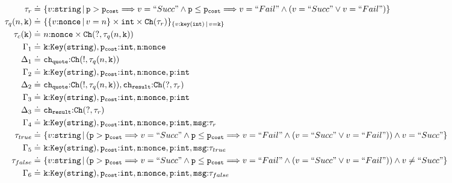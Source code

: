 \documentclass[master,english]{kuisthesis}
\theoremstyle{definition}
\begin{document}
{\small
\begin{align*}
    \tau_{r} \doteq&\ \nut{string}{
\price > \costprice {\implies}
 v = \success \land
\price \leq \costprice {\implies} 
v = \fail \land (v = \success \lor v = \fail)  }
    \\\tau_{q}(n,\Code{k}) \doteq&\ \{\nut{nonce}{v = n} \times \Code{int} \times \Ch(\tau_{r})\}_{\nut{key(int)}{v = \Code{k}}}
    \\\tau_{c}(\Code{k}) \doteq&\ n{:}\Code{nonce} \times \Ch(?,\tau_{q}(n, \Code{k}))
    \\\Gamma_1 \doteq&\  \Code{k}{:}\keyT{\Code{string}},\costprice{:}\Code{int},\Code{n}{:}\Code{nonce}
    \\\Delta_1 \doteq&\ \chq{:}\Ch(!,\tau_{q}(n, \Code{k}))
    \\\Gamma_2 \doteq&\  \Code{k}{:}\keyT{\Code{string}},\costprice{:}\Code{int},\Code{n}{:}\Code{nonce}, \price{:}\Code{int}
    \\\Delta_2 \doteq&\ \chq{:}\Ch(!,\tau_{q}(n, \Code{k})), \chr{:}\Ch(?,\tau_{r})
    \\\Gamma_3 \doteq&\ \Code{k}{:}\keyT{\Code{string}},\costprice{:}\Code{int},\Code{n}{:}\Code{nonce}, \price{:}\Code{int} 
    \\\Delta_3 \doteq&\ \chr{:}\Ch(?,\tau_{r})
    \\\Gamma_4 \doteq&\ \Code{k}{:}\keyT{\Code{string}},\costprice{:}\Code{int},\Code{n}{:}\Code{nonce}, \price{:}\Code{int}, \Code{msg}{:}\tau_{r}
    \\\tau_{true} \doteq&\ \nut{string}{(
\price > \costprice {\implies}
 v = \success \land
\price \leq \costprice {\implies} 
v = \fail \land (v = \success \lor v = \fail)) \land v = \success}
    \\\Gamma_5 \doteq&\ \Code{k}{:}\keyT{\Code{string}},\costprice{:}\Code{int},\Code{n}{:}\Code{nonce}, \price{:}\Code{int}, \Code{msg}{:}\tau_{true}
    \\\tau_{false} \doteq&\ \nut{string}{( 
\price > \costprice {\implies}
 v = \success \land
\price \leq \costprice {\implies} 
v = \fail \land (v = \success \lor v = \fail)) \land v \not= \success}
    \\\Gamma_6 \doteq&\ \Code{k}{:}\keyT{\Code{string}},\costprice{:}\Code{int},\Code{n}{:}\Code{nonce}, \price{:}\Code{int}, \Code{msg}{:}\tau_{false}
\end{align*}}
\end{document}
